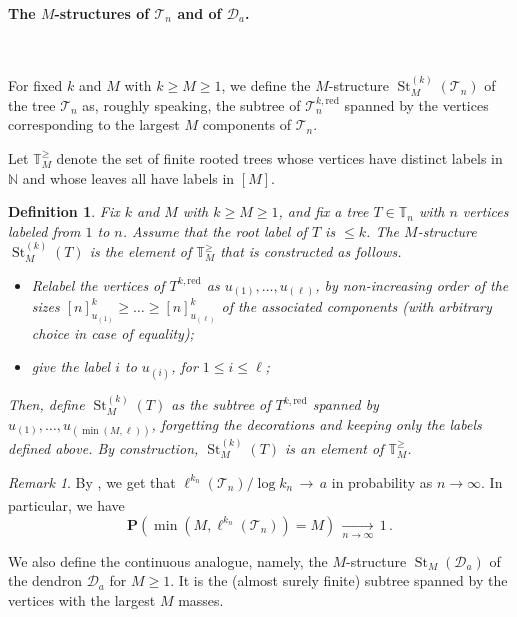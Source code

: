 \documentclass{article}
\newtheorem{definition}[theorem]{Definition}
\theoremstyle{remark}
\newtheorem{remark}{Remark}
\newcommand{\bT}{\mathbb{T}}
\newcommand{\cv}[1]{\,\underset{#1}{\longrightarrow}\,}
\newcommand{\cT}{\mathcal{T}}
\newcommand{\cD}{\mathcal{D}}
\newcommand{\prob}[1]{\mathbf{P}{\left(#1\right)}}
\newcommand{\red}{\mathrm{red}}
\DeclareMathOperator{\St}{St}
\begin{document}
\paragraph{The $M$-structures of $\cT_n$ and of $\cD_a$.}
\

\smallskip

\noindent
For fixed $k$ and $M$ with $k \geq M \geq 1$, we define the $M$-structure $\St_M^{(k)}(\cT_n)$ of the tree $\cT_n$ as, roughly speaking, the subtree of $\cT_n^{k,\red}$ spanned by the vertices corresponding to the largest $M$ components of $\cT_n$. 

Let $\mathbb{T}_M^{\geq}$ denote the set of finite rooted trees whose vertices have distinct labels in $\mathbb{N}$  and whose leaves all have labels in $[M]$.

\begin{definition}
\label{def: M structure of discrete tree}
Fix $k$ and $M$ with $k \geq M \geq 1$, and fix a tree $T\in\bT_n$ with $n$ vertices labeled from $1$ to $n$. 
Assume that the root label of $T$ is $\le k$.
The $M$-structure $\St_M^{(k)}(T)$ is the element of $\mathbb{T}_M^{\geq}$ that is constructed as follows.
\begin{itemize}
    \item Relabel the vertices of $T^{k,\red}$ as $u_{(1)}, \ldots, u_{(\ell)}$, by non-increasing order of the sizes $[n]_{u_{(1)}}^k \ge \ldots \ge [n]_{u_{(\ell)}}^k$ of the associated components (with arbitrary choice in case of equality);
    \item give the label $i$ to $u_{(i)}$, for $1 \leq i \leq \ell$;
\end{itemize}
Then, define $\St_M^{(k)}(T)$ as the subtree of $T^{k,\red}$ spanned by $u_{(1)}, \ldots, u_{(\min(M,\ell))}$, forgetting the decorations and keeping only the labels defined above. 
By construction, $\St_M^{(k)}(T)$ is an element of $\mathbb{T}_M^{\geq}$.
\end{definition}

\begin{remark}
   By , we get that $\ell^{k_n}(\cT_n)/\log k_n \cv{} a$ in probability as $n \to \infty$. 
   In particular, we have 
    \[
    \prob{\min(M,\ell^{k_n}(\cT_n)) = M} \cv{n\to\infty} 1 \,.
    \]
\end{remark}

We also define the continuous analogue, namely, the $M$-structure $\St_M(\cD_a)$ of the dendron $\cD_a$ for $M \geq 1$. 
It is the (almost surely finite) subtree spanned by the vertices with the largest $M$ masses.
\end{document}
